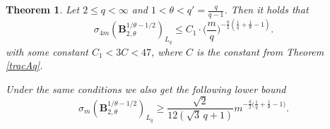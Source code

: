 \documentclass[11pt,reqno]{article}
\numberwithin{equation}{section}
\theoremstyle{definition}
\theoremstyle{plain}
\newtheorem{satz}{Theorem}[section]
\begin{document}
\begin{satz}\label{extend_trac_B}
  Let \(2 \leq q < \infty\) and \(1 < \theta < q'= \frac{q}{q-1}\). Then it holds that
\begin{equation}\label{thm:4.4_interpol_B}
      \sigma_{4m}(\mathbf{B}^{1/\theta-1/2}_{2,\theta})_{L_q} \leq C_1 \cdot \Big(\frac{m}{q}\Big)^{-\frac{q}{2}\left(\frac{1}{q}+\frac{1}{\theta}-1\right)}.
  \end{equation} 
  with some constant \(C_1  < 3C < 47 \), where \(C\) is the constant from Theorem \ref{tracAq}.

 Under the same conditions we also get the following lower bound \begin{equation}\label{thm:4.4_interpol__B}
      \sigma_{m}(\mathbf{B}^{1/\theta-1/2}_{2,\theta})_{L_q} \geq
      \frac{\sqrt{2}}{ 12 (\sqrt{3}\, q + 1) }
 m^{ -\frac{q}{2}\big(\frac{1}{q}+\frac{1}{\theta}-1\big)} .
  \end{equation}  
 \end{satz}
\end{document}
